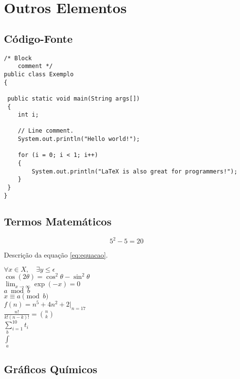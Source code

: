 \chapter{Outros Elementos}

\section{Código-Fonte}
\begin{lstlisting}
/* Block
    comment */
public class Exemplo
{

 public static void main(String args[])
 {
    int i;
 
    // Line comment.
    System.out.println("Hello world!");
 
    for (i = 0; i < 1; i++)
    {
        System.out.println("LaTeX is also great for programmers!");
    }
 }
}
\end{lstlisting}

\section{Termos Matemáticos}

\begin{equation} 
\label{eq:equacao} %
5^2 - 5 = 20
\end{equation}

Descrição da equação \ref{eq:equacao}.

\noindent $\forall x \in X, \quad \exists y \leq \epsilon$
\\
$\cos (2\theta) = \cos^2 \theta - \sin^2 \theta$
\\
$\lim_{x \to \infty} \exp(-x) = 0$
\\
$a \bmod b$
\\
$x \equiv a \pmod b$
\\
$f(n) = n^5 + 4n^2 + 2 |_{n=17}$
\\
$\frac{n!}{k!(n-k)!} = \binom{n}{k}$
\\
$\sum_{i=1}^{10} t_i$
\\
$\int\limits_a^b$

\section{Gráficos Químicos}

 \\

